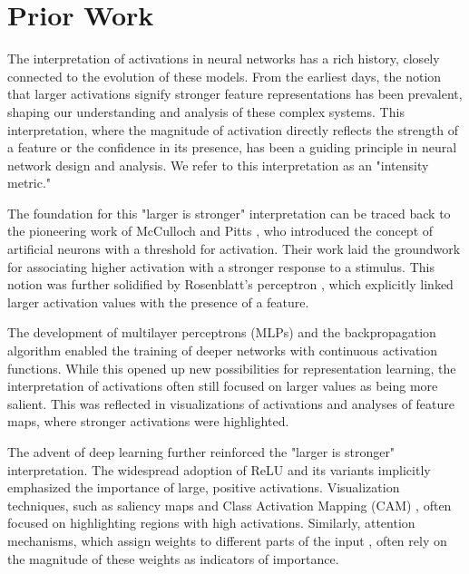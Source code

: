 \section{Prior Work}

The interpretation of activations in neural networks has a rich history, closely connected to the evolution of these models. \citep{lecun1998gradient} From the earliest days, the notion that larger activations signify stronger feature representations has been prevalent, shaping our understanding and analysis of these complex systems. \citep{erhan2009visualizing, lecun1998gradient, mcculloch1943logical, rosenblatt1958perceptron, rumelhart1986learning} This interpretation, where the magnitude of activation directly reflects the strength of a feature or the confidence in its presence, has been a guiding principle in neural network design and analysis. \citep{zeiler2014visualizing,yosinski2015understanding,olah2017feature}  We refer to this interpretation as an "intensity metric." \citep{simonyan2013deep}

The foundation for this "larger is stronger" interpretation can be traced back to the pioneering work of McCulloch and Pitts \citep{mcculloch1943logical}, who introduced the concept of artificial neurons with a threshold for activation. Their work laid the groundwork for associating higher activation with a stronger response to a stimulus. This notion was further solidified by Rosenblatt's perceptron \citep{rosenblatt1958perceptron}, which explicitly linked larger activation values with the presence of a feature. \citep{rosenblatt1958perceptron,olah2017feature}

The development of multilayer perceptrons (MLPs) and the backpropagation algorithm \citep{rumelhart1986learning} enabled the training of deeper networks with continuous activation functions. \citep{lecun1989backpropagation,hornik1989multilayer,glorot2011deep} While this opened up new possibilities for representation learning, the interpretation of activations often still focused on larger values as being more salient. This was reflected in visualizations of activations and analyses of feature maps, where stronger activations were highlighted. \citep{zeiler2014visualizing,yosinski2015understanding}

The advent of deep learning further reinforced the "larger is stronger" interpretation. \citep{krizhevsky2012imagenet} The widespread adoption of ReLU and its variants \citep{nair2010rectified,glorot2011deep} implicitly emphasized the importance of large, positive activations.  Visualization techniques, such as saliency maps \citep{simonyan2013deep} and Class Activation Mapping (CAM) \citep{zhou2016learning}, often focused on highlighting regions with high activations. Similarly, attention mechanisms, which assign weights to different parts of the input \citep{bahdanau2014neural,vaswani2017attention}, often rely on the magnitude of these weights as indicators of importance. 

